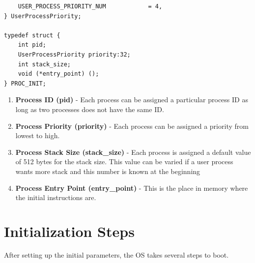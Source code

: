 \documentclass[12pt]{report}
\begin{document}
\begin{enumerate}
\begin{lstlisting}
    USER_PROCESS_PRIORITY_NUM            = 4,
} UserProcessPriority;

typedef struct {
    int pid;
    UserProcessPriority priority:32;
    int stack_size;
    void (*entry_point) ();
} PROC_INIT;
\end{lstlisting}
        \begin{enumerate}
            \item { \bf Process ID (pid) }- Each process can be assigned a particular process ID as long as two processes does not have the same ID.
            \item { \bf Process Priority (priority) }- Each process can be assigned a priority from lowest to high.
            \item { \bf Process Stack Size (stack\_size) }- Each process is assigned a default value of 512 bytes for the stack size. This value can be varied if a user process wants more stack and this number is known at the beginning
            \item { \bf Process Entry Point (entry\_point) }- This is the place in memory where the initial instructions are.
        \end{enumerate}
\end{enumerate}

\section{Initialization Steps}
After setting up the initial parameters, the OS takes several steps to boot.
\end{document}
